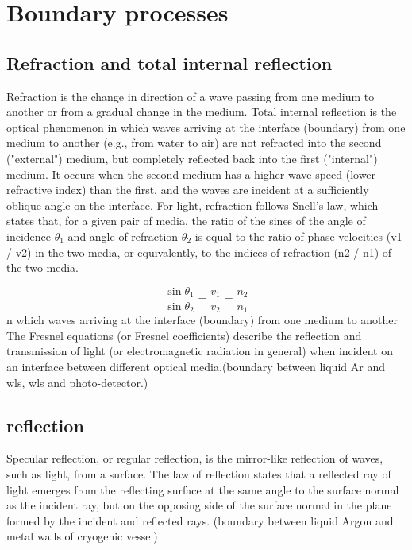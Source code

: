 \documentclass[a4paper]{jpconf}
\begin{document}
  \section{Boundary processes}
  \subsection{Refraction and total internal reflection}
Refraction is the change in direction of a wave passing from one medium to another or from a gradual change in the medium.
Total internal reflection is the optical phenomenon in which waves arriving at the interface (boundary) from one medium to another (e.g., from water to air) are not refracted into the second ("external") medium, but completely reflected back into the first ("internal") medium. It occurs when the second medium has a higher wave speed (lower refractive index) than the first, and the waves are incident at a sufficiently oblique angle on the interface.
For light, refraction follows Snell's law, which states that, for a given pair of media, the ratio of the sines of the angle of incidence $\theta_1$ and angle of refraction $\theta_2$ is equal to the ratio of phase velocities (v1 / v2) in the two media, or equivalently, to the indices of refraction (n2 / n1) of the two media.

  \begin{equation}
    \frac{\sin \theta _{1}}{\sin \theta _{2}}=\frac{v_{1}}{v_{2}}=\frac {n_{2}}{n_{1}}
  \label{equ:snell}
\end{equation}
    n which waves arriving at the interface (boundary) from one medium to another
  The Fresnel equations (or Fresnel coefficients) describe the reflection and transmission of light (or electromagnetic radiation in general) when incident on an interface between different optical media.(boundary between liquid Ar and wls, wls and
  photo-detector.)

\subsection{reflection} 
 Specular reflection, or regular reflection, is the mirror-like reflection of waves, such as light, from a surface.
  The law of reflection states that a reflected ray of light emerges from the reflecting surface at the same angle to the surface normal as the incident ray, but on the opposing side of the surface normal in the plane formed by the incident and reflected rays.
  (boundary between liquid  Argon and metal walls of cryogenic vessel)
\end{document}
